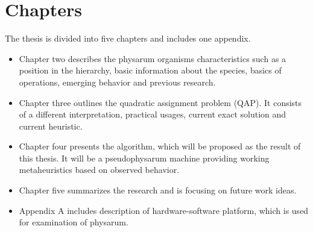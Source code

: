 \section{Chapters}
\label{section:introduction_chapters}

The thesis is divided into five chapters and includes one appendix.

\begin{itemize}  
\item Chapter two describes the physarum organisms characteristics such as a position in the hierarchy, basic information about the species, basics of operations, emerging behavior and previous research.
\item Chapter three outlines the quadratic assignment problem (QAP). It consists of a different interpretation, practical usages, current exact solution and current heuristic. 
\item Chapter four presents the algorithm, which will be proposed as the result of this thesis. It will be a pseudophysarum machine providing working metaheuristics based on observed behavior.
\item Chapter five summarizes the research and is focusing on future work ideas.
\item Appendix A includes description of hardware-software platform, which is used for examination of physarum.
\end{itemize}